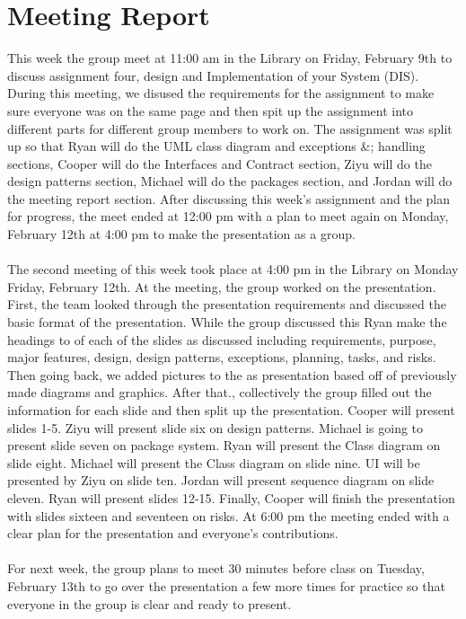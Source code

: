 \documentclass[a4paper]{article}
\begin{document}
\section{Meeting Report}
This week the group meet at 11:00 am in the Library on Friday, February 9th to
discuss assignment four, design and Implementation of your System (DIS). During this
meeting, we disused the requirements for the assignment to make sure everyone was
on the same page and then spit up the assignment into different parts for different group
members to work on. The assignment was split up so that Ryan will do the UML class
diagram and exceptions \&; handling sections, Cooper will do the Interfaces and Contract
section, Ziyu will do the design patterns section, Michael will do the packages section,
and Jordan will do the meeting report section. After discussing this week’s assignment
and the plan for progress, the meet ended at 12:00 pm with a plan to meet again on
Monday, February 12th at 4:00 pm to make the presentation as a group.\\
\\
The second meeting of this week took place at 4:00 pm in the Library on Monday
Friday, February 12th. At the meeting, the group worked on the presentation. First, the
team looked through the presentation requirements and discussed the basic format of
the presentation. While the group discussed this Ryan make the headings to of each of
the slides as discussed including requirements, purpose, major features, design, design
patterns, exceptions, planning, tasks, and risks. Then going back, we added pictures to
the as presentation based off of previously made diagrams and graphics. After that.,
collectively the group filled out the information for each slide and then split up the
presentation. Cooper will present slides 1-5. Ziyu will present slide six on design
patterns. Michael is going to present slide seven on package system. Ryan will present
the Class diagram on slide eight. Michael will present the Class diagram on slide nine.
UI will be presented by Ziyu on slide ten. Jordan will present sequence diagram on slide
eleven. Ryan will present slides 12-15. Finally, Cooper will finish the presentation with
slides sixteen and seventeen on risks. At 6:00 pm the meeting ended with a clear plan
for the presentation and everyone’s contributions.\\
\\
For next week, the group plans to meet 30 minutes before class on Tuesday,
February 13th to go over the presentation a few more times for practice so that
everyone in the group is clear and ready to present.
\end{document}
